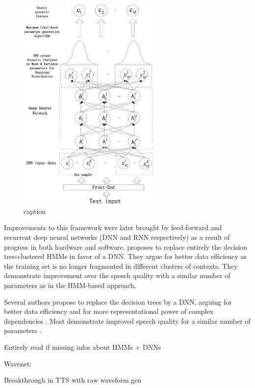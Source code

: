 \documentclass[a4paper, oneside]{article}
\begin{document}
\begin{figure}
	\vspace{-0.6cm}
	\centering
	\includegraphics[width=7cm]{images/dnn_spss.png}
	\caption{caption}
	\label{label}
	\vspace{-1.1cm}
\end{figure}

Improvements to this framework were later brought by feed-forward and recurrent deep neural networks (DNN and RNN respectively) as a result of progress in both hardware and software. \cite{SPSSDNN} proposes to replace entirely the decision tree-clustered HMMs in favor of a DNN. They argue for better data efficiency as the training set is no longer fragmented in different clusters of contexts. They demonstrate improvement over the speech quality with a similar number of parameters as in the HMM-based approach.


\color{blue}
Several authors propose to replace the decision trees by a DNN, arguing for better data efficiency and for more representational power of complex dependencies \cite{Hashimoto-2015, Lu_combininga, 6854318, Yin2014ModelingDP}. Most demonstrate improved speech quality for a similar number of parameters \cite{Hashimoto-2015, 6854318, Yin2014ModelingDP}.
\color{black}

\color{red} Entirely read \cite{Hashimoto-2015} if missing infos about HMMs + DNNs \color{black}


\color{red}


Wavenet:

Breakthrough in TTS with raw waveform gen
\end{document}
